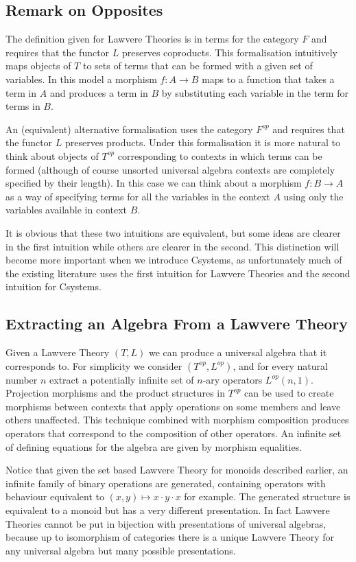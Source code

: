 \subsection{Remark on Opposites}
The definition given for Lawvere Theories is in terms for the category $F$ and
requires that the functor $L$ preserves coproducts. This formalisation
intuitively maps objects of $T$ to sets of terms that can be formed with a given
set of variables. In this model a morphism $f:A\to B$ maps to a function that
takes a term in $A$ and produces a term in $B$ by substituting each variable in
the term for terms in $B$.

An (equivalent) alternative formalisation uses the category $F^{op}$ and
requires that the functor $L$ preserves products. Under this formalisation it
is more natural to think about objects of $T^{op}$ corresponding to contexts in
which terms can be formed (although of course unsorted universal algebra
contexts are completely specified by their length). In this case we can think
about a morphism $f:B\to A$ as a way of specifying terms for all the variables
in the context $A$ using only the variables available in context $B$. 

It is obvious that these two intuitions are equivalent, but some ideas are
clearer in the first intuition while others are clearer in the second. This
distinction will become more important when we introduce Csystems, as
unfortunately much of the existing literature uses the first intuition for
Lawvere Theories and the second intuition for Csystems.

\subsection{Extracting an Algebra From a Lawvere Theory}
Given a Lawvere Theory $(T,L)$ we can produce a universal algebra that it
corresponds to. For simplicity we consider $(T^{op}, L^{op})$, and for every
natural number $n$ extract a potentially infinite set of $n$-ary operators
$L^{op}(n,1)$. Projection morphisms and the product structures in $T^{op}$ can
be used to create morphisms between contexts that apply operations on some
members and leave others unaffected. This technique combined with morphism
composition produces operators that correspond to the composition of other
operators. An infinite set of defining equations for the algebra are given by
morphism equalities.

Notice that given the set based Lawvere Theory for monoids described earlier, an
infinite family of binary operations are generated, containing operators with
behaviour equivalent to $(x,y)\mapsto x\cdot y\cdot x$ for example. The
generated structure is equivalent to a monoid but has a very different
presentation. In fact Lawvere Theories cannot be put in bijection with
presentations of universal algebras, because up to isomorphism of categories
there is a unique Lawvere Theory for any universal algebra but many possible
presentations.

